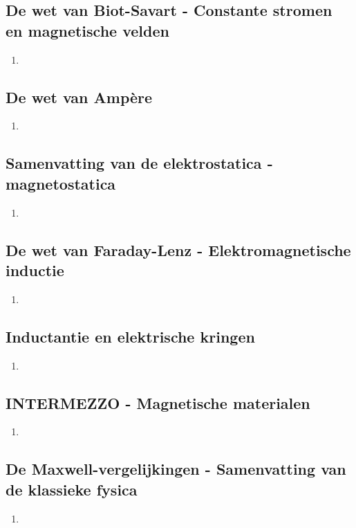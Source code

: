 \documentclass[a4paper,12pt]{article}
\begin{document}
    \subsection{De wet van Biot-Savart - Constante stromen en magnetische velden}
    \begin{enumerate}
        \item 
    \end{enumerate}
    \subsection{De wet van Ampère}
    \begin{enumerate}
        \item 
    \end{enumerate}
    \subsection{Samenvatting van de elektrostatica - magnetostatica}
    \begin{enumerate}
        \item 
    \end{enumerate}
    \subsection{De wet van Faraday-Lenz - Elektromagnetische inductie}
    \begin{enumerate}
        \item 
    \end{enumerate}
    \subsection{Inductantie en elektrische kringen}
    \begin{enumerate}
        \item 
    \end{enumerate}
    \subsection{INTERMEZZO - Magnetische materialen}
    \begin{enumerate}
        \item 
    \end{enumerate}
    \subsection{De Maxwell-vergelijkingen - Samenvatting van de klassieke fysica}
    \begin{enumerate}
        \item 
    \end{enumerate}
\end{document}
